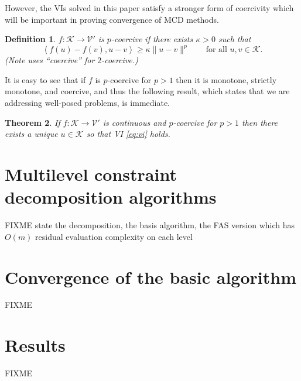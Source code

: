 \documentclass[letterpaper,final,12pt,reqno]{amsart}
\theoremstyle{cstyle}
\newtheorem{theorem}{Theorem}
\theoremstyle{dstyle}
\newtheorem{definition}[theorem]{Definition}
\numberwithin{equation}{section}
\numberwithin{figure}{section}
\numberwithin{table}{section}
\numberwithin{theorem}{section}
\newcommand{\cK}{\mathcal{K}}
\newcommand{\cV}{\mathcal{V}}
\newcommand{\ip}[2]{\left<#1,#2\right>}
\begin{document}
However, the VIs solved in this paper satisfy a stronger form of coercivity which will be important in proving convergence of MCD methods.

\begin{definition}  $f:\cK \to \cV'$ is \emph{$p$-coercive} if there exists $\kappa>0$ such that
\begin{equation}
\ip{f(u)-f(v)}{u-v} \ge \kappa \|u-v\|^p \qquad \text{for all } u,v \in \cK. \label{eq:pcoercive}
\end{equation}
(Note \cite{Tai2003} uses ``coercive'' for $2$-coercive.)
\end{definition}

It is easy to see that if $f$ is $p$-coercive for $p>1$ then it is monotone, strictly monotone, and coercive, and thus the following result, which states that we are addressing well-posed problems, is immediate.

\begin{theorem}  \label{thm:viwellposed}  If $f:\cK \to \cV'$ is continuous and $p$-coercive for $p>1$ then there exists a unique $u\in \cK$ so that VI \eqref{eq:vi} holds.
\end{theorem}

\section{Multilevel constraint decomposition algorithms} \label{sec:algorithms}

FIXME state the decomposition, the basis algorithm, the FAS version which has $O(m)$ residual evaluation complexity on each level

\section{Convergence of the basic algorithm} \label{sec:convergence}

FIXME

\section{Results} \label{sec:results}

FIXME


\small

\bigskip


\end{document}
